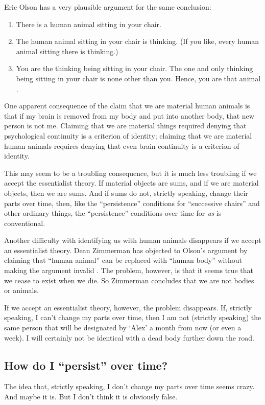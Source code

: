 \documentclass[12pt,twoside]{reedfancy}
\begin{document}
\begin{spacing}{1.25}
Eric Olson has a very plausible argument for the same conclusion:

\begin{enumerate}
  \item There is a human animal sitting in your chair.
  \item The human animal sitting in your chair is thinking. (If you
    like, every human animal sitting there is thinking.)
  \item You are the thinking being sitting in your chair. The one and
    only thinking being sitting in your chair is none other than
    you. Hence, you are that animal \citeyearpar[354]{olson2003a}.
\end{enumerate}

One apparent consequence of the claim that we are material human
animals is that if my brain is removed from my body and put into
another body, that new person is not me.  Claiming that we are
material things required denying that psychological continuity is a
criterion of identity; claiming that we are material human animals
requires denying that even brain continuity is a criterion of
identity.

This may seem to be a troubling consequence, but it is much less
troubling if we accept the essentialist theory.  If material objects
are sums, and if we are material objects, then we are sums.  And if
sums do not, strictly speaking, change their parts over time, then,
like the ``persistence'' conditions for ``successive chairs'' and
other ordinary things, the ``persistence'' conditions over time for
{\em us} is conventional.

Another difficulty with identifying us with human animals disappears
if we accept an essentialist theory.  Dean Zimmerman has objected to
Olson's argument by claiming that ``human animal'' can be replaced
with ``human body'' without making the argument invalid
\citeyearpar[24]{zimmerman2008a}.  The problem, however, is that it
seems true that we cease to exist when we die.  So Zimmerman concludes
that we are not bodies or animals.

If we accept an essentialist theory, however, the problem disappears.
If, strictly speaking, I can't change my parts over time, then I am
not (strictly speaking) the same person that will be designated by
`Alex' a month from now (or even a week).  I will certainly not be
identical with a dead body further down the road.

\subsection{How do I ``persist'' over time?}
\label{person-persist}
The idea that, strictly speaking, I don't change my parts over time
seems crazy.  And maybe it is.  But I don't think it is obviously
false.


\end{spacing}
\end{document}
